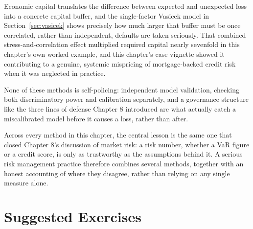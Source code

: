 \documentclass[../ai_in_finance]{subfiles}
\begin{document}
Economic capital translates the difference between expected and unexpected loss into a concrete capital buffer, and the single-factor Vasicek model in Section~\ref{sec:vasicek} shows precisely how much larger that buffer must be once correlated, rather than independent, defaults are taken seriously. That combined stress-and-correlation effect multiplied required capital nearly sevenfold in this chapter's own worked example, and this chapter's case vignette showed it contributing to a genuine, systemic mispricing of mortgage-backed credit risk when it was neglected in practice.

None of these methods is self-policing: independent model validation, checking both discriminatory power and calibration separately, and a governance structure like the three lines of defense Chapter 8 introduced are what actually catch a miscalibrated model before it causes a loss, rather than after.

Across every method in this chapter, the central lesson is the same one that closed Chapter 8's discussion of market risk: a risk number, whether a VaR figure or a credit score, is only as trustworthy as the assumptions behind it. A serious risk management practice therefore combines several methods, together with an honest accounting of where they disagree, rather than relying on any single measure alone.

\section{Suggested Exercises}
\end{document}
